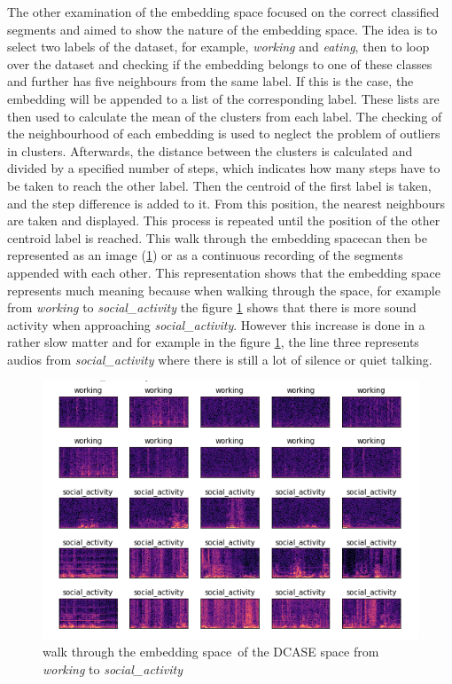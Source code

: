 \newline
\newline
The other examination of the embedding space focused on the correct classified segments and aimed to show the nature of the embedding space. The idea is to select two labels of the dataset, for example, \textit{working} and \textit{eating}, then to loop over the dataset and checking if the embedding belongs to one of these classes and further has five neighbours from the same label. If this is the case, the embedding will be appended to a list of the corresponding label. These lists are then used to calculate the mean of the clusters from each label. The checking of the neighbourhood of each embedding is used to neglect the problem of outliers in clusters. Afterwards, the distance between the clusters is calculated and divided by a specified number of steps, which indicates how many steps have to be taken to reach the other label. Then the centroid of the first label is taken, and the step difference is added to it. From this position, the nearest neighbours are taken and displayed. This process is repeated until the position of the other centroid label is reached. This \flqq walk through the embedding space\frqq can then be represented as an image (\ref{fig:Walk-through-DCASE}) or as a continuous recording of the segments appended with each other. This representation shows that the embedding space represents much meaning because when walking through the space, for example from \textit{working} to \textit{social\_activity} the figure \ref{fig:Walk-through-DCASE} shows that there is more sound activity when approaching \textit{social\_activity}. However this increase is done in a rather slow matter and for example in the figure \ref{fig:Walk-through-DCASE}, the line three represents audios from \textit{social\_activity} where there is still a lot of silence or quiet talking.
\begin{figure}[ht]
\centering
    \includegraphics[width=0.8\linewidth]{img/Walk_through_dcase_space.png}
    \caption{\flqq walk through the embedding space\frqq \ of the DCASE space from \textit{working} to \textit{social\_activity}}
    \label{fig:Walk-through-DCASE}
\end{figure}

